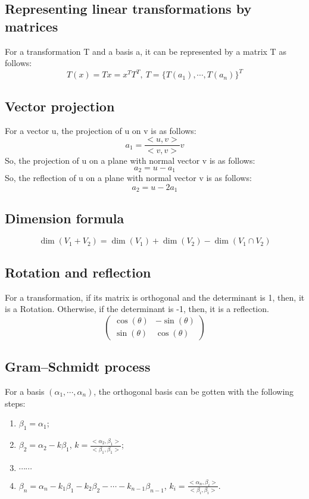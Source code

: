 \documentclass{article}
\begin{document}
    \subsection*{Representing linear transformations by matrices}
    For a transformation T and a basis a, it can be represented by a matrix T as follows: 
    \begin{equation*}
        T(x)=Tx=x^{T}T^T,\ T=\{T(a_1),\cdots,T(a_n)\}^T
    \end{equation*}
    \subsection*{Vector projection}
    For a vector u, the projection of u on v is as follows: 
    \begin{equation*}
        a_1=\frac{<u,v>}{<v,v>}v
    \end{equation*}
    So, the projection of u on a plane with normal vector v is as follows:
    \begin{equation*}
        a_2=u-a_1
    \end{equation*}
    So, the reflection of u on a plane with normal vector v is as follows:
    \begin{equation*}
        a_2=u-2a_1
    \end{equation*}
    \subsection*{Dimension formula}
    \begin{equation*}
        \dim(V_1+V_2)=\dim(V_1)+\dim(V_2)-\dim(V_1\cap V_2)
    \end{equation*}
    \subsection*{Rotation and reflection}
    For a transformation, if its matrix is orthogonal and the determinant is 1, then, it is a Rotation. Otherwise, if the determinant is -1, then, it is a reflection. 
    \begin{equation*}
        \left(\begin{matrix}
            \cos(\theta)&-\sin(\theta)\\
            \sin(\theta)&\cos(\theta)
        \end{matrix}\right)
    \end{equation*}
    \subsection*{Gram–Schmidt process}
    For a basis $(\alpha_1,\cdots,\alpha_n)$, the orthogonal basis can be gotten with the following steps: 
    \begin{enumerate}
        \item $\beta_1=\alpha_1$; 
        \item $\beta_2=\alpha_2-k\beta_1$, $k=\frac{<\alpha_2,\beta_1>}{<\beta_1, \beta_1>}$; 
        \item $\cdots \cdots$
        \item $\beta_n=\alpha_n-k_1\beta_1-k_2\beta_2-\cdots-k_{n-1}\beta_{n-1}$, $k_{i}=\frac{<\alpha_n,\beta_i>}{<\beta_i,\beta_i>}$. 
    \end{enumerate}
\end{document}

